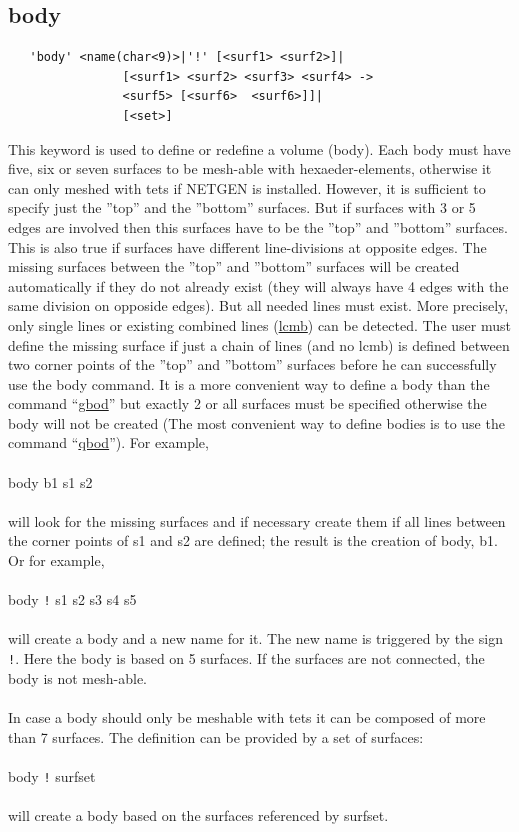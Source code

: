 \documentclass{article}
\providecommand{\htmlref}[2]{\hyperref[#2]{#1}}
\begin{document}
\subsection{\label{body}body}
\begin{verbatim}
   'body' <name(char<9)>|'!' [<surf1> <surf2>]|
                [<surf1> <surf2> <surf3> <surf4> ->
                <surf5> [<surf6>  <surf6>]]|
                [<set>]
\end{verbatim}
This keyword is used to define or redefine a volume (body). Each body must have five, six or seven surfaces to be mesh-able with hexaeder-elements, otherwise it can only meshed with tets if NETGEN \cite{NETGEN} is installed. However, it is sufficient to specify just the ''top'' and the ''bottom'' surfaces. But if surfaces with 3 or 5 edges are involved then this surfaces have to be the ''top'' and ''bottom'' surfaces. This is also true if surfaces have different line-divisions at opposite edges. The missing surfaces between the ''top'' and ''bottom'' surfaces will be created automatically if they do not already exist (they will always have 4 edges with the same division on opposide edges). But all needed lines must exist. More precisely, only single lines or existing combined lines (\htmlref{lcmb}{lcmb}) can be detected. The user must define the missing surface if just a chain of lines (and no lcmb) is defined between two corner points of the ''top'' and ''bottom'' surfaces before he can successfully use the body command. It is a more convenient way to define a body than the command ``\htmlref{gbod}{gbod}'' but exactly 2 or all surfaces must be specified otherwise the body will not be created (The most convenient way to define bodies is to use the command ``\htmlref{qbod}{qbod}''). 
For example,\\\\body b1 s1 s2\\\\will look for the missing surfaces and if necessary create them if all lines between the corner points of s1 and s2 are defined; the result is the creation of body, b1. Or for example,\\\\body \verb_!_ s1 s2 s3 s4 s5\\\\will create  a body and a new name for it. The new name is triggered by the sign \verb_!_. Here the body is based on 5 surfaces. If the surfaces are not connected, the body is not mesh-able.\\\\In case a body should only be meshable with tets it can be composed of more than 7 surfaces. The definition can be provided by a set of surfaces:\\\\body \verb_!_ surfset\\\\will create  a body based on the surfaces referenced by surfset.
\end{document}
